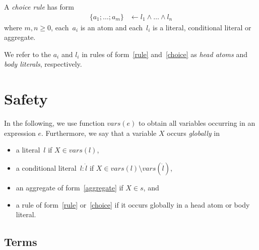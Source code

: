 \documentclass{article}
\newcommand{\tuple}[1]{\dot{#1}}
\newcommand\Vars{\mathit{vars}}
\begin{document}
	A \emph{choice rule} has form
	\begin{align}
		\{a_1; \dots; a_m\} &\leftarrow l_1 \wedge \dots \wedge l_n \label{choice}
	\end{align}
	where
	$m, n \geq 0$,
	each~$a_i$ is an atom and
	each~$l_i$ is a literal, conditional literal or aggregate.

	We refer to the $a_i$ and $l_i$ in rules of form~\eqref{rule} and~\eqref{choice} as \emph{head atoms} and \emph{body literals}, respectively.

	\section{Safety}

	In the following, we use function $\Vars(e)$ to obtain all variables occurring in an expression $e$.
	Furthermore, we say that a variable $X$ occurs \emph{globally} in
	\begin{itemize}
		\item a literal~$l$ if $X \in \Vars(l)$,
		\item a conditional literal~$l : \tuple{l}$ if $X \in \Vars(l) \setminus \Vars(\tuple{l})$,
		\item an aggregate of form~\eqref{aggregate} if $X \in s$, and
		\item a rule of form~\eqref{rule} or~\eqref{choice} if it occurs globally in a head atom or body literal.
	\end{itemize}

	\subsection{Terms}
\end{document}
